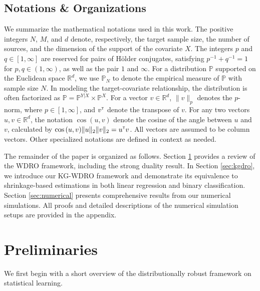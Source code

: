 \documentclass[12pt]{article}
\begin{document}
\subsection{Notations \& Organizations}
We summarize the mathematical notations used in this work. The positive integers \(N\), \(M\), and \(d\) denote, respectively, the target sample size, the number of sources, and the dimension of the support of the covariate \(X\). The integers \(p\) and \(q \in [1, \infty]\) are reserved for pairs of H\"{o}lder conjugates, satisfying \(p^{-1} + q^{-1} = 1\) for \(p, q \in (1, \infty)\), as well as the pair $1$ and $\infty$. For a distribution \(\mathbb{P}\) supported on the Euclidean space \(\mathbb{R}^d\), we use \(\mathbb{P}_N\) to denote the empirical measure of \(\mathbb{P}\) with sample size \(N\). In modeling the target-covariate relationship, the distribution is often factorized as \(\mathbb{P} = \mathbb{P}^{Y|X} \times \mathbb{P}^X\). For a vector \(v \in \mathbb{R}^d\), \(\|v\|_p\) denotes the \(p\)-norm, where \(p \in [1, \infty]\), and $v^{\scriptscriptstyle \sf T}$ denote the transpose of $v$. For any two vectors $u,v \in \mathbb{R}^d$, the notation $\cos{(u,v)}$ denote the cosine of the angle between $u$ and $v$, calculated by $\cos{(u,v)}\Vert u\Vert_2\Vert v\Vert_2 = u^{\scriptscriptstyle \sf T} v$. All vectors are assumed to be column vectors. Other specialized notations are defined in context as needed.

The remainder of the paper is organized as follows. Section \ref{sec:prelim} provides a review of the WDRO framework, including the strong duality result. In Section \ref{sec:kgdro}, we introduce our KG-WDRO framework and demonstrate its equivalence to shrinkage-based estimations in both linear regression and binary classification. Section \ref{sec:numerical} presents comprehensive results from our numerical simulations. All proofs and detailed descriptions of the numerical simulation setups are provided in the appendix.

\section{Preliminaries}
\label{sec:prelim}
We first begin with a short overview of the distributionally robust framework on statistical learning.
\end{document}
